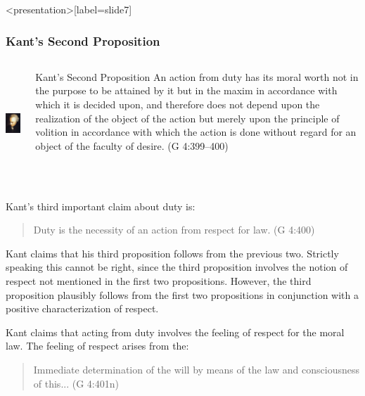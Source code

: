 \begin{frame}<presentation>[label=slide7]
    \frametitle{Kant's Second Proposition}
        \begin{columns}
            \begin{column}{3cm}
                \includegraphics[height=4cm]{../../graphics/kant.jpg}
            \end{column}
            \begin{column}{7cm}
                \begin{block}{Kant's Second Proposition}
                	An action from duty has its moral worth not in the purpose to be attained by it but in the maxim in accordance with which it is decided upon, and therefore does not depend upon the realization of the object of the action but merely upon the principle of volition in accordance with which the action is done without regard for an object of the faculty of desire. (G 4:399--400)
                \end{block}
                
            \end{column}
        \end{columns}
\end{frame}

Kant's third important claim about duty is:

\begin{quote}
	Duty is the necessity of an action from respect for law. (G 4:400)
\end{quote}

Kant claims that his third proposition follows from the previous two. Strictly speaking this cannot be right, since the third proposition involves the notion of respect not mentioned in the first two propositions. However, the third proposition plausibly follows from the first two propositions in conjunction with a positive characterization of respect.

Kant claims that acting from duty involves the feeling of respect for the moral law. The feeling of respect arises from the:

\begin{quote}
	Immediate determination of the will by means of the law and consciousness of this... (G 4:401n)
\end{quote}


